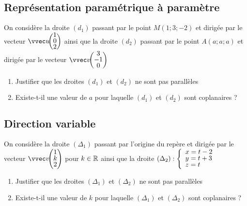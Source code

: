 \documentclass[oneside,12pt]{book}          %
\begin{document}
\subsection{Représentation paramétrique à paramètre}
On considère la droite $(d_1)$ passant par le point $M(1;3;-2)$ et dirigée par le vecteur $\vcoord{u}{1\\0\\2}$ ainsi que la droite $(d_2)$ passant par le point $A(a;a;a)$ et dirigée par le vecteur $\vcoord{v}{3\\-1\\0}$
\begin{enumerate}
	\item Justifier que les droites $(d_1)$ et $(d_2)$ ne sont pas parallèles
    \item Existe-t-il une valeur de $a$ pour laquelle $(d_1)$ et $(d_2)$ sont coplanaires ?
\end{enumerate}



\subsection{Direction variable}
On considère la droite $(\Delta_1)$ passant par l'origine du repère et dirigée par le vecteur $\vcoord{v}{1\\k\\2}$ pour $k\in{\mathbb R}$ ainsi que la droite $(\Delta_2): \accol{x=t-2\\y=t+3\\z=t}$
\begin{enumerate}
    \item Justifier que les droites $(\Delta_1)$ et $(\Delta_2)$ ne sont pas parallèles
	\item Existe-t-il une valeur de $k$ pour laquelle $(\Delta_1)$ et $(\Delta_2)$ sont coplanaires ?
\end{enumerate}
\end{document}
